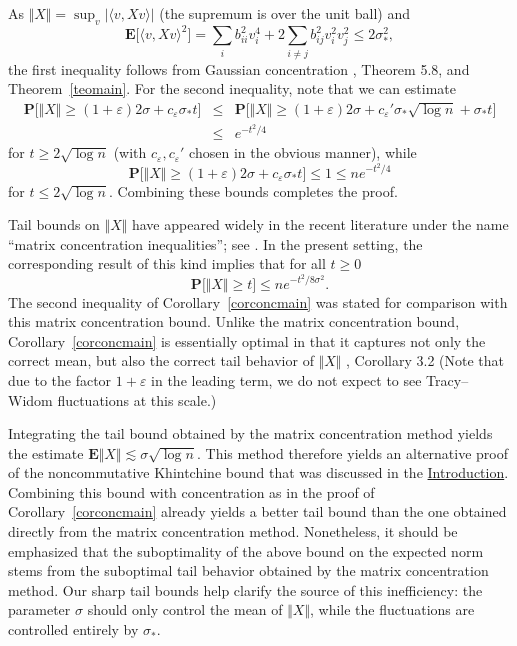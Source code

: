 \documentclass[aop,MSNbibl,dvips]{arximspdf}
\newcommand{\rrvert}{\vert}
\newcommand{\rrVert}{\Vert}
\newcommand{\llvert}{\vert}
\newcommand{\llVert}{\Vert}
\newcommand{\EE}{\mathbf{E}}
\begin{document}
\begin{pf}
As $\llVert X\rrVert =\sup_v\llvert \langle v,Xv\rangle\rrvert $
(the supremum is
over the unit ball) and
%
\[
\EE\bigl[\langle v,Xv\rangle^2\bigr] = \sum
_ib_{ii}^2v_i^4
+ 2\sum_{i\ne j}b_{ij}^2v_i^2v_j^2
\le2\sigma_*^2, %
\]
%
the first inequality follows from Gaussian concentration
\cite{BLM13}, Theorem 5.8, and Theorem~\ref{teomain}. For the second
inequality, note that we can estimate
%
\begin{eqnarray*}
\mathbf{P}\bigl[\llVert X\rrVert\ge(1+\varepsilon)2\sigma+
c_\varepsilon
\sigma_* t\bigr] &\le& \mathbf{P}\bigl[\llVert X\rrVert\ge(1+\varepsilon
)2\sigma+
c_\varepsilon'\sigma_*\sqrt{\log n}+\sigma_*t\bigr]
\\
&\le& e^{-t^2/4}
\end{eqnarray*}
%
for $t\ge2\sqrt{\log n}$ (with $c_\varepsilon,c_\varepsilon'$ chosen
in the obvious manner), while
%
\[
\mathbf{P}\bigl[\llVert X\rrVert\ge(1+\varepsilon)2\sigma+
c_\varepsilon
\sigma_* t\bigr] \le1 \le ne^{-t^2/4} %
\]
%
for $t\le2\sqrt{\log n}$. Combining these bounds completes the proof.
\end{pf}

Tail bounds on $\llVert X\rrVert $ have appeared widely in the recent
literature under the name ``matrix concentration inequalities''; see
\cite{Oli10,Tro12}. In the present setting, the
corresponding result of this kind implies that for all $t\ge0$
%
\[
\mathbf{P}\bigl[\llVert X\rrVert\ge t\bigr] \le ne^{-t^2/8\sigma^2}. %
\]
%
The second inequality of Corollary~\ref{corconcmain}
was stated for comparison with this matrix concentration bound.
Unlike the matrix concentration bound, Corollary~\ref{corconcmain} is
essentially optimal in that it captures not only the correct mean, but
also the correct tail behavior of $\llVert X\rrVert $ \cite{LT91},
Corollary 3.2
(Note that due to the factor $1+\varepsilon$ in the leading term, we
do not expect to see Tracy--Widom fluctuations at this scale.)

%
\begin{rem}
Integrating the tail bound obtained by the matrix concentration method
yields the estimate $\EE\llVert X\rrVert \lesssim\sigma\sqrt{\log
n}$. This method
therefore yields an alternative proof of the noncommutative Khintchine
bound that was discussed in the \hyperref[sec1]{Introduction}. Combining this bound with
concentration as in the proof of Corollary~\ref{corconcmain} already
yields a better tail bound than the one obtained directly from the matrix
concentration method. Nonetheless, it should be emphasized that the
suboptimality of the above bound on the expected norm stems from the
suboptimal tail behavior obtained by the matrix concentration method. Our
sharp tail bounds help clarify the source of this inefficiency: the
parameter $\sigma$ should only control the mean of $\llVert X\rrVert
$, while the
fluctuations are controlled entirely by $\sigma_*$.
\end{rem}
\end{document}
